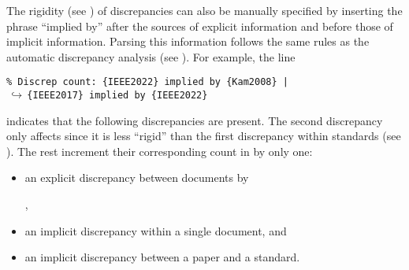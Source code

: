The rigidity (see ) of discrepancies can also be manually
specified by inserting the phrase ``implied by'' after the sources of explicit
information and before those of implicit information. Parsing this information
follows the same rules as the automatic discrepancy analysis
(see ). For example, the line

\begin{displayquote}
    \texttt{\% Discrep count: \{IEEE2022\} implied by \{Kam2008\} |\\
        $\,\hookrightarrow\,$\quad \{IEEE2017\} implied by \{IEEE2022\}}
\end{displayquote}

indicates that the following discrepancies are present. The second discrepancy
only affects  since it is less ``rigid'' than the
first discrepancy within standards (see ). The rest increment their
corresponding count in 
by only one:

\begin{itemize}
    \item an explicit discrepancy between documents by
          \begin{NoHyper}\citeauthor{IEEE2022}\end{NoHyper},
    \item an implicit discrepancy within a single document, and
    \item an implicit discrepancy between a paper and a standard.
\end{itemize}
